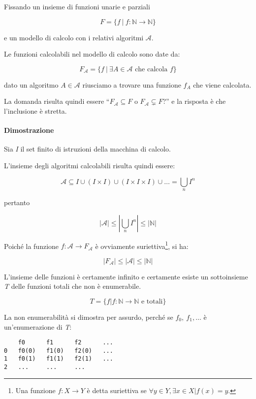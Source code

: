 Fissando un insieme di funzioni unarie e parziali

$$ F = \{f \: |\: f: \mathbb{N} \rightarrow \mathbb{N}\}$$

e un modello di calcolo con i relativi algoritmi $\mathcal{A}$.

Le funzioni calcolabili nel modello di calcolo sono date da:

$$
F_\mathcal{A} = \{f \: |\: \exists A \in \mathcal{A} \text{ che calcola } f\}
$$

dato un algoritmo $ A \in \mathcal{A}$ riusciamo a trovare una funzione $f_A$ che
viene calcolata.

La domanda risulta quindi essere ``$F_\mathcal{A} \subseteq F$ o $ F_\mathcal{A} \subsetneq F $?'' e la risposta è che l'inclusione è stretta.

\paragraph{Dimostrazione}\label{dimostrazione}

Sia \emph{I} il set finito di istruzioni della macchina di calcolo.

L'insieme degli algoritmi calcolabili risulta quindi essere:

$$
\mathcal{A} \subseteq I \cup ( I \times I ) \cup ( I \times I \times I ) \cup \ldots = \bigcup_n I^n
$$

pertanto

$$
|\mathcal{A}| \leq |\bigcup_n I^n| \leq |\mathbb{N}|
$$

Poiché la funzione $ f: \mathcal{A} \rightarrow F_\mathcal{A}$  è ovviamente suriettiva\footnote{Una funzione $f : X \rightarrow Y $ è detta suriettiva se $ \forall y \in Y, \exists x \in X | f(x) = y$.},  si ha:

$$
|F_\mathcal{A}| \leq |\mathcal{A}| \leq |\mathbb{N}|
$$

L'insieme delle funzioni è certamente infinito e certamente esiste un
sottoinsieme \emph{T} delle funzioni totali che non è enumerabile.

$$
T = \{ f | f : \mathbb{N} \rightarrow \mathbb{N} \text{ e totali}\}
$$

La non enumerabilità si dimostra per assurdo, perché se
$f_0,\ f_1, \ldots$ è un'enumerazione di \emph{T}:

\begin{verbatim}
    f0      f1      f2      ...
0   f0(0)   f1(0)   f2(0)   ...
1   f0(1)   f1(1)   f2(1)   ...
2   ...     ...     ...
\end{verbatim}

